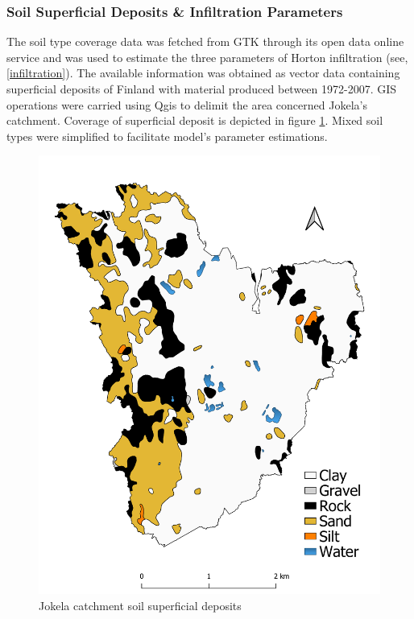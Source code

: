 
\subsubsection{Soil Superficial Deposits \& Infiltration Parameters}
\label{infiltrationcs}
    
The soil type coverage data was fetched from \acf{GTK} \cite{gtkdata} through its open data online service and was used to estimate the three parameters of Horton infiltration (see, \ref{infiltration}). The available information was obtained as vector data containing superficial deposits of Finland with material produced between 1972-2007. GIS operations were carried using Qgis to delimit the area concerned Jokela's catchment. Coverage of superficial deposit is depicted in figure \ref{fig:supdeposits}. Mixed soil types were simplified to facilitate model's parameter estimations.\\
    
\begin{figure}[h]
    \centering
	\includegraphics[scale=0.4]{figures/Jokela_Superficial_Deposits.pdf}
	\caption{Jokela catchment soil superficial deposits}
	\label{fig:supdeposits}
\end{figure}

